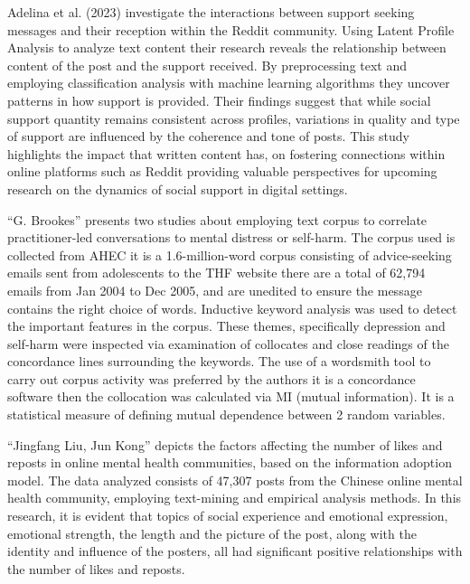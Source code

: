\documentclass[sigconf, nonacm]{acmart}
\begin{document}
Adelina et al. (2023) investigate the interactions between support seeking messages and their reception within the Reddit community. Using Latent Profile Analysis to analyze text content their research reveals the relationship between content of the post and the support received. By preprocessing text and employing classification analysis with machine learning algorithms they uncover patterns in how support is provided. Their findings suggest that while social support quantity remains consistent across profiles, variations in quality and type of support are influenced by the coherence and tone of posts. This study highlights the impact that written content has, on fostering connections within online platforms such as Reddit providing valuable perspectives for upcoming research on the dynamics of social support in digital settings. 

“G. Brookes” presents two studies about employing text corpus to correlate practitioner-led conversations to mental distress or self-harm. The corpus used is collected from AHEC it is a 1.6-million-word corpus consisting of advice-seeking emails sent from adolescents to the THF website there are a total of 62,794 emails from Jan 2004 to Dec 2005, and are unedited to ensure the message contains the right choice of words. Inductive keyword analysis was used to detect the important features in the corpus. These themes, specifically depression and self-harm were inspected via examination of collocates and close readings of the concordance lines surrounding the keywords. The use of a wordsmith tool to carry out corpus activity was preferred by the authors it is a concordance software then the collocation was calculated via MI (mutual information). It is a statistical measure of defining mutual dependence between 2 random variables. 

“Jingfang Liu, Jun Kong” depicts the factors affecting the number of likes and reposts in online mental health communities, based on the information adoption model. The data analyzed consists of 47,307 posts from the Chinese online mental health community, employing text-mining and empirical analysis methods. In this research, it is evident that topics of social experience and emotional expression, emotional strength, the length and the picture of the post, along with the identity and influence of the posters, all had significant positive relationships with the number of likes and reposts.
\end{document}
